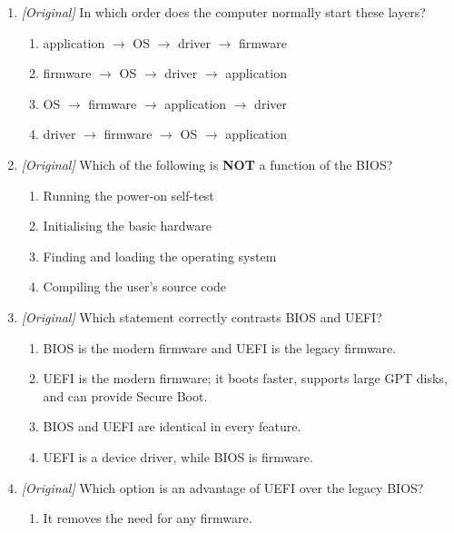 \documentclass[11pt]{article}
\begin{document}
\begin{enumerate}[label=\textbf{Q\arabic*.}, leftmargin=*]
\begin{enumerate}[label=\Alph*.]
      specific device.
    \item the same as the BIOS.
    \item a type of cache memory.
  \end{enumerate}
\item \textit{[Original]} In which order does the computer normally start
  these layers?
  \begin{enumerate}[label=\Alph*.]
    \item application $\rightarrow$ OS $\rightarrow$ driver $\rightarrow$
      firmware
    \item firmware $\rightarrow$ OS $\rightarrow$ driver $\rightarrow$
      application
    \item OS $\rightarrow$ firmware $\rightarrow$ application $\rightarrow$
      driver
    \item driver $\rightarrow$ firmware $\rightarrow$ OS $\rightarrow$
      application
  \end{enumerate}
\item \textit{[Original]} Which of the following is \textbf{NOT} a function
  of the BIOS?
  \begin{enumerate}[label=\Alph*.]
    \item Running the power-on self-test
    \item Initialising the basic hardware
    \item Finding and loading the operating system
    \item Compiling the user's source code
  \end{enumerate}
\item \textit{[Original]} Which statement correctly contrasts BIOS and UEFI?
  \begin{enumerate}[label=\Alph*.]
    \item BIOS is the modern firmware and UEFI is the legacy firmware.
    \item UEFI is the modern firmware; it boots faster, supports large GPT
      disks, and can provide Secure Boot.
    \item BIOS and UEFI are identical in every feature.
    \item UEFI is a device driver, while BIOS is firmware.
  \end{enumerate}
\item \textit{[Original]} Which option is an advantage of UEFI over the
  legacy BIOS?
  \begin{enumerate}[label=\Alph*.]
    \item It removes the need for any firmware.

\end{enumerate}
\end{enumerate}
\end{document}
